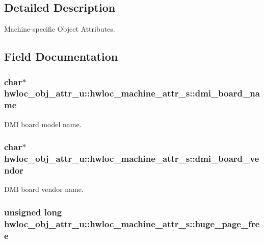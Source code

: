 \subsection{Detailed Description}
Machine-specific Object Attributes. 

\subsection{Field Documentation}
\hypertarget{structhwloc__obj__attr__u_1_1hwloc__machine__attr__s_8b99af84fd38753a91c861f0e856b461}{
\subsubsection[{dmi\_\-board\_\-name}]{\setlength{\rightskip}{0pt plus 5cm}char$\ast$ {\bf hwloc\_\-obj\_\-attr\_\-u::hwloc\_\-machine\_\-attr\_\-s::dmi\_\-board\_\-name}}}
\label{structhwloc__obj__attr__u_1_1hwloc__machine__attr__s_8b99af84fd38753a91c861f0e856b461}


DMI board model name. 

\hypertarget{structhwloc__obj__attr__u_1_1hwloc__machine__attr__s_ae85be0b4ebb86501718c4b460df5167}{
\subsubsection[{dmi\_\-board\_\-vendor}]{\setlength{\rightskip}{0pt plus 5cm}char$\ast$ {\bf hwloc\_\-obj\_\-attr\_\-u::hwloc\_\-machine\_\-attr\_\-s::dmi\_\-board\_\-vendor}}}
\label{structhwloc__obj__attr__u_1_1hwloc__machine__attr__s_ae85be0b4ebb86501718c4b460df5167}


DMI board vendor name. 

\hypertarget{structhwloc__obj__attr__u_1_1hwloc__machine__attr__s_87ff3de9e181599328be92c932cb7a16}{
\subsubsection[{huge\_\-page\_\-free}]{\setlength{\rightskip}{0pt plus 5cm}unsigned long {\bf hwloc\_\-obj\_\-attr\_\-u::hwloc\_\-machine\_\-attr\_\-s::huge\_\-page\_\-free}}}
\label{structhwloc__obj__attr__u_1_1hwloc__machine__attr__s_87ff3de9e181599328be92c932cb7a16}


